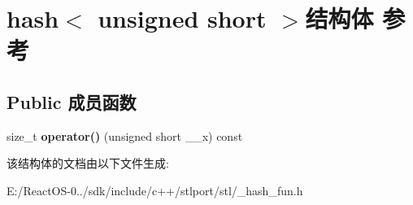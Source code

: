 \hypertarget{structhash_3_01unsigned_01short_01_4}{}\section{hash$<$ unsigned short $>$结构体 参考}
\label{structhash_3_01unsigned_01short_01_4}
\subsection*{Public 成员函数}
\begin{DoxyCompactItemize}
\item 
\mbox{\label{structhash_3_01unsigned_01short_01_4_ae423f2f6e2a57a9f019f6cd6a4e33bd2}} 
size\+\_\+t {\bfseries operator()} (unsigned short \+\_\+\+\_\+x) const
\end{DoxyCompactItemize}


该结构体的文档由以下文件生成\+:\begin{DoxyCompactItemize}
\item 
E\+:/\+React\+O\+S-\/0../sdk/include/c++/stlport/stl/\+\_\+hash\+\_\+fun.\+h\end{DoxyCompactItemize}

